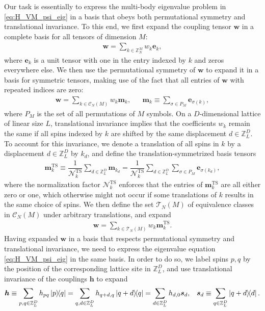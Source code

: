 \documentclass[nofootinbib,notitlepage,11pt]{revtex4-2}
\renewcommand{\t}{\text} %
\newcommand{\f}[2]{\dfrac{#1}{#2}} %
\newcommand{\p}[1]{\left(#1\right)} %
\newcommand{\m}{\bm} %
\newcommand{\1}{\mathds{1}}
\newcommand{\C}{\mathcal{C}}
\newcommand{\N}{\mathcal{N}}
\newcommand{\T}{\mathcal{T}}
\newcommand{\ZZ}{\mathbb{Z}}
\begin{document}
Our task is essentially to express the multi-body eigenvalue problem
in \eqref{eq:H_VM_psi_eig} in a basis that obeys both permutational
symmetry and translational invariance.  To this end, we first expand
the coupling tensor $\m w$ in a complete basis for all tensors of
dimension $M$:
\begin{align}
  \m w = \sum_{k\in\ZZ_N^M} w_k \m e_k,
\end{align}
where $\m e_k$ is a unit tensor with one in the entry indexed by $k$
and zeros everywhere else.  We then use the permutational symmetry of
$\m w$ to expand it in a basis for symmetric tensors, making use of
the fact that all entries of $\m w$ with repeated indices are zero:
\begin{align}
  \m w = \sum_{k\in\C_N\p{M}} w_k \m m_k,
  &&
  \m m_k \equiv \sum_{\sigma\in P_M} \m e_{\sigma\p{k}},
  \label{eq:sym_tensor}
\end{align}
where $P_M$ is the set of all permutations of $M$ symbols.  On a
$D$-dimensional lattice of linear size $L$, translational invariance
implies that the coefficients $w_k$ remain the same if all spins
indexed by $k$ are shifted by the same displacement $d\in\ZZ_L^D$.  To
account for this invariance, we denote a translation of all spins in
$k$ by a displacement $d\in\ZZ_L^D$ by $k_d$, and define the
translation-symmetrized basis tensors
\begin{align}
  \m m_k^{\t{TS}}
  \equiv \f1{\N_k^{\t{TS}}} \sum_{d\in\ZZ_L^D} \m m_{k_d}
  = \f1{\N_k^{\t{TS}}} \sum_{d\in\ZZ_L^D} \sum_{\sigma\in P_M}
  \m e_{\sigma(k_d)},
\end{align}
where the normalization factor $\N_k^{\t{TS}}$ enforces that the
entries of $\m m_k^{\t{TS}}$ are all either zero or one, which
otherwise might not occur if some translations of $k$ results in the
same choice of spins.  We then define the set $\T_N\p{M}$ of
equivalence classes in $\C_N\p{M}$ under arbitrary translations, and
expand
\begin{align}
  \m w = \sum_{k\in\T_N\p{M}} w_k \m m_k^{\t{TS}}.
  \label{eq:sym_shift_tensor}
\end{align}
Having expanded $\m w$ in a basis that respects permutational symmetry
and translational invariance, we need to express the eigenvalue
equation \eqref{eq:H_VM_psi_eig} in the same basis.  In order to do
so, we label spins $p,q$ by the position of the corresponding lattice
site in $\ZZ_L^D$, and use translational invariance of the couplings
$\m h$ to expand
\begin{align}
  \m h \equiv \sum_{p,q\in\ZZ_L^D} h_{pq} \op{p}{q}
  = \sum_{q,d\in\ZZ_L^D} h_{q+d,q} \op{q+d}{q}
  = \sum_{d\in\ZZ_L^D} h_{d,0} \m s_d,
  &&
  \m s_d \equiv \sum_{q\in\ZZ_L^D} \op{q+d}{d}.
\end{align}
\end{document}
